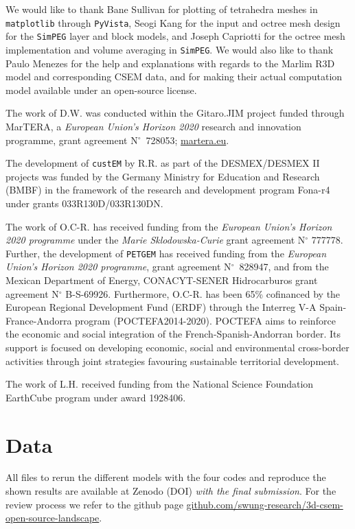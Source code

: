 \documentclass[
    paper,
  ]{geophysics}
\newcommand{\simpeg}{\texttt{SimPEG}\xspace}
\newcommand{\custem}{\texttt{custEM}\xspace}
\newcommand{\petgem}{\texttt{PETGEM}\xspace}
\begin{document}
We would like to thank Bane Sullivan for plotting of tetrahedra meshes in \texttt{matplotlib} through \texttt{PyVista}, Seogi Kang for the input and octree mesh design for the \simpeg layer and block models, and Joseph Capriotti for the octree mesh implementation and volume averaging in \simpeg. We would also like to thank Paulo Menezes for the help and explanations with regards to the Marlim R3D model and corresponding CSEM data, and for making their actual computation model available under an open-source license.

The work of D.W. was conducted within the Gitaro.JIM project funded through MarTERA, a \emph{European Union's Horizon 2020} research and innovation programme, grant agreement N$^\circ$~728053; \href{https://www.martera.eu}{martera.eu}.

The development of \custem by R.R. as part of the DESMEX/DESMEX II projects was funded by the Germany Ministry for Education and Research (BMBF) in the framework of the research and development program Fona-r4 under grants 033R130D/033R130DN.

The work of O.C-R. has received funding from the \emph{European Union's Horizon 2020 programme} under the \emph{Marie Sklodowska-Curie} grant agreement N$^\circ$ 777778. Further, the development of \petgem has received funding from the \emph{European Union's Horizon 2020 programme}, grant agreement N$^\circ$~828947, and from the Mexican Department of Energy, CONACYT-SENER Hidrocarburos grant agreement N$^\circ$ B-S-69926. Furthermore, O.C-R. has been 65\% cofinanced by the European Regional Development Fund (ERDF) through the Interreg V-A Spain-France-Andorra program (POCTEFA2014-2020). POCTEFA aims to reinforce the economic and social integration of the French-Spanish-Andorran border. Its support is focused on developing economic, social and environmental cross-border activities through joint strategies favouring sustainable territorial development.

The work of L.H. received funding from the National Science Foundation EarthCube program under award 1928406.

\section{Data}

All files to rerun the different models with the four codes and reproduce the shown results are available at Zenodo (DOI) \emph{with the final submission}. For the review process we refer to the github page \href{https://github.com/swung-research/3d-csem-open-source-landscape}{github.com/swung-research/3d-csem-open-source-landscape}.


\end{document}
